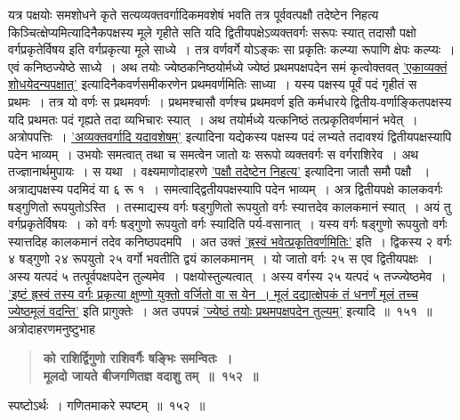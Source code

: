 \documentclass[11pt, openany]{book}
\begin{document}
\newpage

\begin{sloppypar}
यत्र पक्षयोः समशोधने कृते सत्यव्यक्तवर्गादिकमवशेषं भवति तत्र पूर्ववत्पक्षौ तदेष्टेन निहत्य किञ्चित्क्षेप्यमित्यादिनैकपक्षस्य मूले गृहीते सति यदि द्वितीयपक्षेऽव्यक्तवर्गः सरूपः स्यात् तदासौ पक्षो वर्गप्रकृतेर्विषय इति वर्गप्रकृत्या मूले साध्ये~। तत्र वर्णवर्गे योऽङ्कः सा प्रकृतिः कल्प्या रूपाणि क्षेपः कल्प्यः~। एवं कनिष्ठज्येष्ठे साध्ये~। अथ तयोः ज्येष्ठकनिष्ठयोर्मध्ये ज्येष्ठं प्रथमपक्षपदेन समं कृत्वोक्तवत् \hyperref[7.89]{'एकाव्यक्तं शोधयेदन्यपक्षात्'} इत्यादिनैकवर्णसमीकरणेन प्रथमवर्णमितिः साध्या~। यस्य पक्षस्य पूर्वं पदं गृहीतं स प्रथमः~। तत्र यो वर्णः स प्रथमवर्णः~। प्रथमश्चासौ वर्णश्च प्रथमवर्ण इति कर्मधारये द्वितीय-वर्णाङ्कितपक्षस्य यदि प्रथमतः पदं गृह्यते तदा व्यभिचारः स्यात्~। अथ तयोर्मध्ये यत्कनिष्ठं तत्प्रकृतिवर्णमानं भवेत्~। अत्रोपपत्तिः~। \hyperref[8.115]{'अव्यक्तवर्गादि यदावशेषम्'} इत्यादिना यद्येकस्य पक्षस्य पदं लभ्यते तदावश्यं द्वितीयपक्षस्यापि पदेन भाव्यम्~। उभयोः समत्वात् तथा च समत्वेन जातो यः सरूपो व्यक्तवर्गः स वर्गराशिरेव~। अथ तज्ज्ञानार्थमुपायः~। स यथा~। वक्ष्यमाणोदाहरणे \hyperref[8.115]{'पक्षौ तदेष्टेन निहत्य'} इत्यादिना जातौ समौ पक्षौ ~। अत्राद्यपक्षस्य पदमिदं या ६ रू १~। समत्वाद्द्वितीयपक्षस्यापि पदेन भाव्यम्~। अत्र द्वितीयपक्षे कालकवर्गः षड्गुणितो रूपयुतोऽस्ति~। तस्माद्यस्य वर्गः षड्गुणितो रूपयुतो वर्गः स्यात्तदेव कालकमानं स्यात्~। अयं तु वर्गप्रकृतेर्विषयः~। को वर्गः षड्गुणो रूपयुतो वर्गः स्यादिति पर्य-वसानात्~। यस्य वर्गः षड्गुणो रूपयुतो वर्गः स्यात्तदिह कालकमानं तदेव कनिष्ठपदमपि~। अत उक्तं \hyperref[10.151]{'ह्रस्वं भवेत्प्रकृतिवर्णमितिः'} इति~। द्विकस्य २ वर्गः ४ षड्गुणो २४ रूपयुतो २५ वर्गो भवतीति द्वयं कालकमानम्~। यो जातो वर्गः २५ स एव द्वितीयपक्षः~। अस्य यत्पदं ५ तत्पूर्वपक्षपदेन तुल्यमेव~। पक्षयोस्तुल्यत्वात्~। अस्य वर्गस्य २५ यत्पदं ५ तज्ज्येष्ठमेव~। \hyperref[6.70]{'इष्टं ह्रस्वं तस्य वर्गः प्रकृत्या क्षुण्णो युक्तो वर्जितो वा स येन~। मूलं दद्यात्क्षेपकं तं धनर्णं मूलं तच्च ज्येष्ठमूलं वदन्ति'} इति प्रागुक्तेः~। अत उपपन्नं \hyperref[10.151]{'ज्येष्ठं तयोः प्रथमपक्षपदेन तुल्यम्'} इत्यादि~॥~१५१~॥\\

{\small अत्रोदाहरणमनुष्टुभाह\textendash }

 \label{10.152}
\begin{quote}
{\large \textbf{{\color{purple}को राशिर्द्विगुणो राशिवर्गैः षङ्भिः समन्वितः~।\\
मूलदो जायते बीजगणितज्ञ वदाशु तम्~॥~१५२~॥}}}
\end{quote}

स्पष्टोऽर्थः~। गणितमाकरे स्पष्टम्~॥~१५२~॥

\end{sloppypar}
\end{document}
